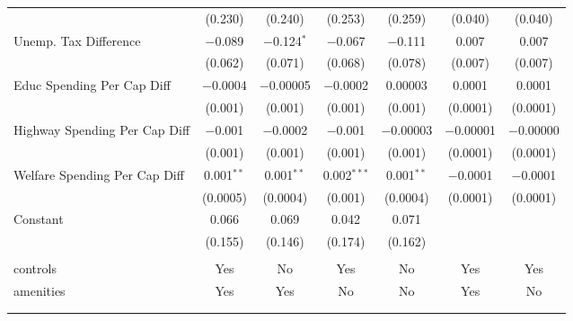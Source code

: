 \begin{table}[!htbp]
\begin{tabular}{@{\extracolsep{5pt}}lcccccc}
  & (0.230) & (0.240) & (0.253) & (0.259) & (0.040) & (0.040) \\ 
  Unemp. Tax Difference & $-$0.089 & $-$0.124$^{*}$ & $-$0.067 & $-$0.111 & 0.007 & 0.007 \\ 
  & (0.062) & (0.071) & (0.068) & (0.078) & (0.007) & (0.007) \\ 
  Educ Spending Per Cap Diff & $-$0.0004 & $-$0.00005 & $-$0.0002 & 0.00003 & 0.0001 & 0.0001 \\ 
  & (0.001) & (0.001) & (0.001) & (0.001) & (0.0001) & (0.0001) \\ 
  Highway Spending Per Cap Diff & $-$0.001 & $-$0.0002 & $-$0.001 & $-$0.00003 & $-$0.00001 & $-$0.00000 \\ 
  & (0.001) & (0.001) & (0.001) & (0.001) & (0.0001) & (0.0001) \\ 
  Welfare Spending Per Cap Diff & 0.001$^{**}$ & 0.001$^{**}$ & 0.002$^{***}$ & 0.001$^{**}$ & $-$0.0001 & $-$0.0001 \\ 
  & (0.0005) & (0.0004) & (0.001) & (0.0004) & (0.0001) & (0.0001) \\ 
  Constant & 0.066 & 0.069 & 0.042 & 0.071 &  &  \\ 
  & (0.155) & (0.146) & (0.174) & (0.162) &  &  \\ 
 \hline \\[-1.8ex] 
controls & Yes & No & Yes & No & Yes & Yes \\ 
amenities & Yes & Yes & No & No & Yes & No \\ 
\hline \\[-1.8ex] 
\hline 
\hline \\[-1.8ex] 
\end{tabular} 
\end{table} 
